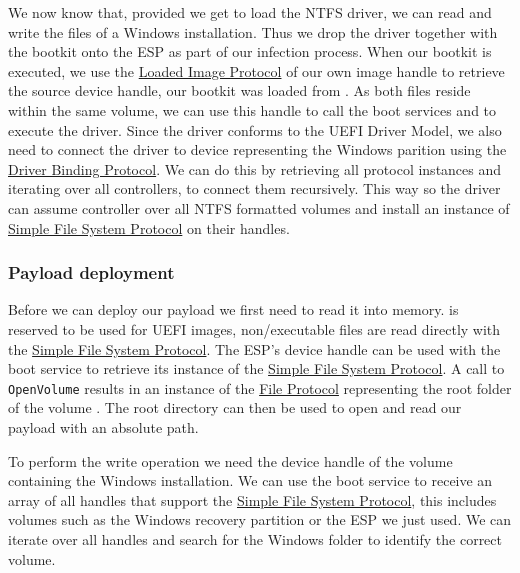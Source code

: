 We now know that, provided we get to load the \ac{NTFS} driver, we can read and write the files of a Windows installation.
Thus we drop the driver together with the bootkit onto the \ac{ESP} as part of our infection process.
When our bootkit is executed, we use the \hyperref[lst:loaded-image-protocol]{Loaded Image Protocol} of our own image handle to retrieve the source device handle, our bootkit was loaded from \cite[Section 9.1]{uefi-spec}.
As both files reside within the same volume, we can use this handle to call the boot services  and  to execute the driver.
Since the driver conforms to the \ac{UEFI} Driver Model, we also need to connect the driver to device representing the Windows parition using the \hyperref[lst:driver-binding-protocol]{Driver Binding Protocol}.
We can do this by retrieving all protocol instances and iterating over all controllers, to connect them recursively.
This way so the driver can assume controller over all \ac{NTFS} formatted volumes and install an instance of \hyperref[lst:simple-file-system-protocol]{Simple File System Protocol} on their handles.

\subsubsection{Payload deployment}

Before we can deploy our payload we first need to read it into memory.
 is reserved to be used for \ac{UEFI} images, non\-/executable files are read directly with the \hyperref[lst:simple-file-system-protocol]{Simple File System Protocol}.
The \ac{ESP}'s device handle can be used with the boot service  to retrieve its instance of the \hyperref[lst:simple-file-system-protocol]{Simple File System Protocol}.
A call to \lstinline{OpenVolume} results in an instance of the \hyperref[lst:simple-file-system-protocol]{File Protocol} representing the root folder of the volume \cite[Section 13.4]{uefi-spec}.
The root directory can then be used to open and read our payload with an absolute path.

To perform the write operation we need the device handle of the volume containing the Windows installation.
We can use the boot service  to receive an array of all handles that support the \hyperref[lst:simple-file-system-protocol]{Simple File System Protocol}, this includes volumes such as the Windows recovery partition or the \ac{ESP} we just used.
We can iterate over all handles and search for the Windows folder to identify the correct volume.

